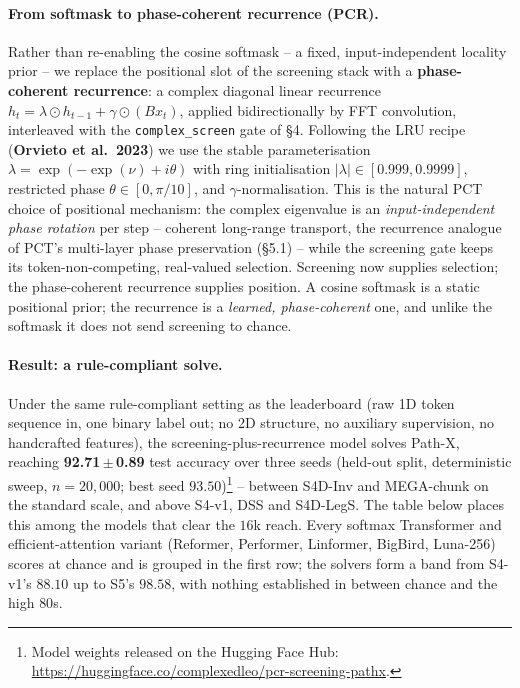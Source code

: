 \documentclass[11pt,a4paper]{article}
\theoremstyle{plain}
\theoremstyle{definition}
\begin{document}
\paragraph{From softmask to phase-coherent recurrence (PCR).}
Rather than re-enabling the cosine softmask -- a fixed, input-independent
locality prior -- we replace the positional slot of the screening stack with a
\textbf{phase-coherent recurrence}: a complex diagonal linear recurrence
$h_t = \lambda \odot h_{t-1} + \gamma \odot (B x_t)$, applied bidirectionally by
FFT convolution, interleaved with the \texttt{complex\_screen} gate of \S{}4.
Following the LRU recipe (\textbf{Orvieto et al.\ 2023}) we use the stable
parameterisation $\lambda = \exp(-\exp(\nu)+i\theta)$ with ring initialisation
$|\lambda|\in[0.999,0.9999]$, restricted phase $\theta\in[0,\pi/10]$, and
$\gamma$-normalisation. This is the natural PCT choice of positional mechanism:
the complex eigenvalue is an \emph{input-independent phase rotation} per step --
coherent long-range transport, the recurrence analogue of PCT's multi-layer
phase preservation (\S{}5.1) -- while the screening gate keeps its
token-non-competing, real-valued selection. Screening now supplies selection;
the phase-coherent recurrence supplies position. A cosine softmask is a static
positional prior; the recurrence is a \emph{learned, phase-coherent} one, and
unlike the softmask it does not send screening to chance.

\paragraph{Result: a rule-compliant solve.}
Under the same rule-compliant setting as the leaderboard (raw 1D token sequence
in, one binary label out; no 2D structure, no auxiliary supervision, no
handcrafted features), the screening-plus-recurrence model solves Path-X,
reaching \textbf{92.71\,$\pm$\,0.89} test accuracy over three seeds (held-out
split, deterministic sweep, $n{=}20{,}000$; best seed
$93.50$)\footnote{Model weights released on the Hugging Face Hub:
\url{https://huggingface.co/complexedleo/pcr-screening-pathx}.} -- between
S4D-Inv and MEGA-chunk on the standard scale, and above S4-v1, DSS and
S4D-LegS. The table below places this among the models that clear the
$16$k reach. Every softmax Transformer and efficient-attention variant
(Reformer, Performer, Linformer, BigBird, Luna-256) scores at chance and is
grouped in the first row; the solvers form a band from S4-v1's $88.10$ up to
S5's $98.58$, with nothing established in between chance and the high $80$s.
\end{document}
